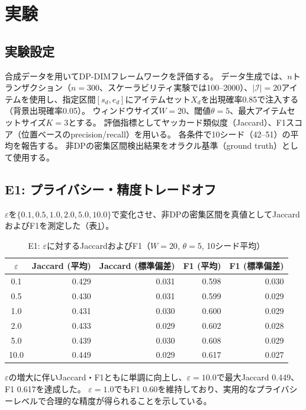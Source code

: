 \section{実験}\label{sec:experiments}

\subsection{実験設定}

合成データを用いてDP-DIMフレームワークを評価する。
データ生成では、$n$トランザクション（$n = 300$、スケーラビリティ実験では100--2000）、$|\mathcal{I}| = 20$アイテムを使用し、指定区間$[s_d, e_d]$にアイテムセット$X_d$を出現確率0.85で注入する（背景出現確率0.05）。
ウィンドウサイズ$W = 20$、閾値$\theta = 5$、最大アイテムセットサイズ$K = 3$とする。
評価指標としてヤッカード類似度（Jaccard）、F1スコア（位置ベースのprecision/recall）を用いる。
各条件で10シード（42--51）の平均を報告する。
非DPの密集区間検出結果をオラクル基準（ground truth）として使用する。

\subsection{E1: プライバシー・精度トレードオフ}

$\varepsilon$を$\{0.1, 0.5, 1.0, 2.0, 5.0, 10.0\}$で変化させ、非DPの密集区間を真値としてJaccardおよびF1を測定した（表\ref{tab:e1}）。

\begin{table}[t]
\centering
\caption{E1: $\varepsilon$に対するJaccardおよびF1（$W=20$, $\theta=5$, 10シード平均）}
\label{tab:e1}
\begin{tabular}{crrrr}
\toprule
$\varepsilon$ & Jaccard (平均) & Jaccard (標準偏差) & F1 (平均) & F1 (標準偏差) \\
\midrule
0.1  & 0.429 & 0.031 & 0.598 & 0.030 \\
0.5  & 0.430 & 0.031 & 0.599 & 0.029 \\
1.0  & 0.431 & 0.030 & 0.600 & 0.029 \\
2.0  & 0.433 & 0.029 & 0.602 & 0.028 \\
5.0  & 0.439 & 0.030 & 0.608 & 0.029 \\
10.0 & 0.449 & 0.029 & 0.617 & 0.027 \\
\bottomrule
\end{tabular}
\end{table}

$\varepsilon$の増大に伴いJaccard・F1ともに単調に向上し、$\varepsilon = 10.0$で最大Jaccard 0.449、F1 0.617を達成した。
$\varepsilon = 1.0$でもF1 0.60を維持しており、実用的なプライバシーレベルで合理的な精度が得られることを示している。

